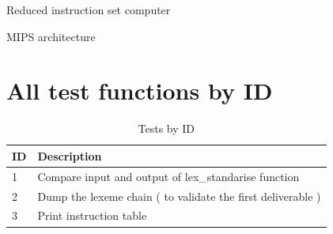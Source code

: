 \documentclass[twoside,twocolumn]{article}
\begin{document}
\begin{thebibliography}{99} %


\newblock Reduced instruction set computer

\newblock MIPS architecture


\end{thebibliography}


\appendix
\section{All test functions by ID}

\begin{table}[!h]
\caption{Tests by ID}
\centering
\begin{tabular}{|p{2cm}|p{2cm}|}
\hline
ID & Description \\
\hline
1 & Compare input and output of lex\_standarise function \\
\hline
2 & Dump the lexeme chain ( to validate the first deliverable ) \\
\hline
3 & Print instruction table \\
\hline
\end{tabular}
\end{table}


% 
\end{document}

